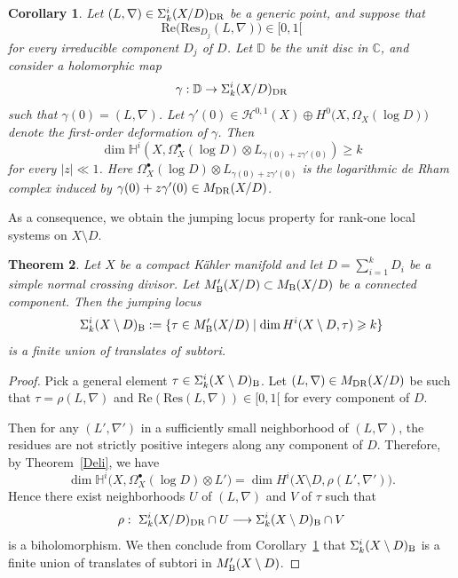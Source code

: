 \documentclass[english]{amsart}
\newcommand{\CC}{\mathbb{C}}
\renewcommand{\ge}{\geqslant}
\newcommand{\Rel}{\mathrm{Re}}
\newcommand{\Res}{\mathrm{Res}}
\newtheorem{thm}{Theorem}[section]
\newtheorem{cor}[thm]{Corollary}
\numberwithin{equation}{thm}
\begin{document}
\begin{cor}\label{nearbygeneric}
	Let $(L,\nabla)\in \Sigma_k^i(X/D)_{\rm DR}$ be a generic point, and suppose that
	\[
	\Rel\bigl(\Res_{D_j}(L,\nabla)\bigr) \in [0,1[
	\]
	for every irreducible component $D_j$ of $D$.
	Let $\mathbb D$ be the unit disc in $\CC$, and consider a holomorphic map
	\[
	\gamma:\mathbb D \to \Sigma_k^i(X/D)_{\rm DR}
	\]
	such that $\gamma(0)=(L,\nabla)$.
	Let $\gamma'(0)\in \mathcal H^{0,1}(X)\oplus H^0\bigl(X,\Omega_X(\log D)\bigr)$ denote the first-order deformation of $\gamma$.
	Then
	\begin{equation}\label{uppertorus}
		\dim \mathbb H^i\!\left(X,\Omega_X^\bullet(\log D)\otimes L_{\gamma(0)+z\gamma'(0)}\right)\ge k
	\end{equation}
	for every $|z|\ll 1$.
	Here $\Omega_X^\bullet(\log D)\otimes L_{\gamma(0)+z\gamma'(0)}$ is the logarithmic de Rham complex induced by $\gamma(0)+z\gamma'(0)\in M_{\rm DR}(X/D)$.
\end{cor}

As a consequence, we obtain the jumping locus property for rank-one local systems on $X\setminus D$.

\begin{thm}\label{complete2}
	Let $X$ be a compact K\"ahler manifold and let $D=\sum_{i=1}^{k} D_i$ be a simple normal crossing divisor.
	Let $M'_{\rm B}(X/D) \subset M_{\rm B}(X/D)$ be a connected component. Then the jumping locus
	\[
	\Sigma_k^i(X\setminus D)_{\rm B}
	:= \{ \tau \in M'_{\rm B}(X/D) \mid \dim H^i(X\setminus D,\tau) \ge k\}
	\]
	is a finite union of translates of subtori.
\end{thm}

\begin{proof}
	Pick a general element $\tau\in \Sigma_k^i(X\setminus D)_{\rm B}$.
	Let $(L,\nabla)\in M_{\rm DR}(X/D)$ be such that $\tau = \rho(L,\nabla)$ and $\Rel(\Res(L,\nabla))\in [0,1[$ for every component of $D$.
	
	Then for any $(L',\nabla')$ in a sufficiently small neighborhood of $(L,\nabla)$, the residues are not strictly positive integers along any component of $D$.
	Therefore, by Theorem~\ref{Deli}, we have
	\[
	\dim \mathbb H^{i}\bigl(X,\Omega_X^\bullet(\log D)\otimes L'\bigr)
	= \dim H^{i}\bigl(X\setminus D,\rho(L',\nabla')\bigr).
	\]
	Hence there exist neighborhoods $U$ of $(L,\nabla)$ and $V$ of $\tau$ such that
	\[
	\rho:\ \Sigma_k^i(X/D)_{\rm DR}\cap U \longrightarrow \Sigma_k^i(X\setminus D)_{\rm B}\cap V
	\]
	is a biholomorphism.
	We then conclude from Corollary~\ref{nearbygeneric} that $\Sigma_k^i(X\setminus D)_{\rm B}$ is a finite union of translates of subtori in $M'_{\rm B}(X\setminus D)$.
\end{proof}
\end{document}
